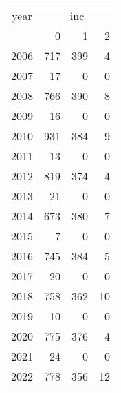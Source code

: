 \footnotesize\begin{tabular}[t]{lrrr}
\toprule
\multicolumn{1}{c}{year} & \multicolumn{3}{c}{inc} \\
\cmidrule(l{3pt}r{3pt}){1-1} \cmidrule(l{3pt}r{3pt}){2-4}
  & 0 & 1 & 2\\
\midrule
2006 & 717 & 399 & 4\\
2007 & 17 & 0 & 0\\
2008 & 766 & 390 & 8\\
2009 & 16 & 0 & 0\\
2010 & 931 & 384 & 9\\
2011 & 13 & 0 & 0\\
2012 & 819 & 374 & 4\\
2013 & 21 & 0 & 0\\
2014 & 673 & 380 & 7\\
2015 & 7 & 0 & 0\\
2016 & 745 & 384 & 5\\
2017 & 20 & 0 & 0\\
2018 & 758 & 362 & 10\\
2019 & 10 & 0 & 0\\
2020 & 775 & 376 & 4\\
2021 & 24 & 0 & 0\\
2022 & 778 & 356 & 12\\
\bottomrule
\end{tabular}
